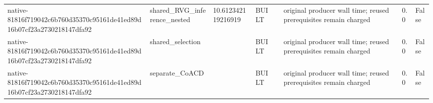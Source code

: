 \begin{tabular}{llllllll}
native-81816f719042c6b760d35370c95161de41ed89d16b07cf23a2730218147dfa92 & shared\_RVG\_inference\_nested & 10.612342119216919 & BUILT &  & original producer wall time; reused prerequisites remain charged & 0.0 & False \\
native-81816f719042c6b760d35370c95161de41ed89d16b07cf23a2730218147dfa92 & shared\_selection &  & BUILT &  & original producer wall time; reused prerequisites remain charged & 0.0 & False \\
native-81816f719042c6b760d35370c95161de41ed89d16b07cf23a2730218147dfa92 & separate\_CoACD &  & BUILT &  & original producer wall time; reused prerequisites remain charged & 0.0 & False \\
\end{tabular}
